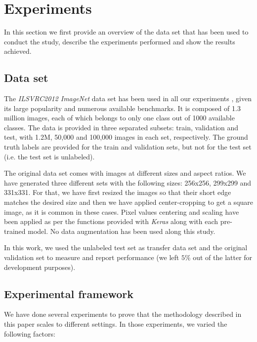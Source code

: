\documentclass{elsarticle}
\begin{document}
	\section{Experiments} \label{sec:experiments}
	In this section we first provide an overview of the data set that has been used to conduct the study, describe the experiments performed and show the results achieved.

	\subsection{Data set}
	The \textit{ILSVRC2012 ImageNet} data set has been used in all our experiments \citep{ILSVRC15}, given its large popularity and numerous available benchmarks. It is composed of 1.3 million images,  each of which belongs to only one class out of 1000 available classes. The data is provided in three separated subsets: train, validation and test, with 1.2M, 50,000 and 100,000 images in each set, respectively. The ground truth labels are provided for the train and validation sets, but not for the test set (i.e. the test set is unlabeled).

	The original data set comes with images at different sizes and aspect ratios. We have generated three different sets with the following sizes: 256x256, 299x299 and 331x331. For that, we have first resized the images so that their short edge matches the desired size and then we have applied center-cropping to get a square image, as it is common in these cases. Pixel values centering and scaling have been applied as per the functions provided with \textit{Keras} along with each pre-trained model. No data augmentation has been used along this study.

	In this work, we used the unlabeled test set as transfer data set and the original validation set to measure and report performance (we left $5\%$ out of the latter for development purposes).

	\subsection{Experimental framework}
	We have done several experiments to prove that the methodology described in this paper scales to different settings. In those experiments, we varied the following factors:
\end{document}
